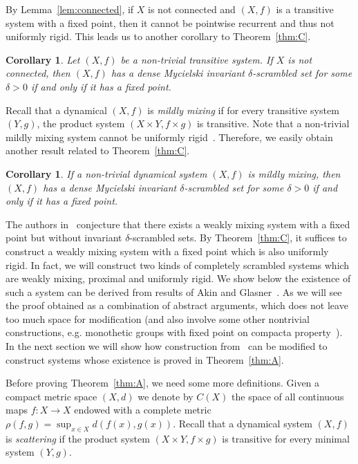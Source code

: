 \documentclass[reqno,a4paper,12pt]{amsart}
\newtheorem{cor}[thm]{Corollary}
\theoremstyle{definition}
\numberwithin{equation}{section}
\begin{document}
By Lemma~\ref{lem:connected}, if $X$ is not connected and $(X,f)$ is a transitive  system with a fixed point,
then it cannot be pointwise recurrent and thus not uniformly rigid.
This leads us to another corollary to Theorem~\ref{thm:C}.

\begin{cor}
Let $(X,f)$ be a non-trivial transitive system.
If $X$ is not connected, then $(X,f)$ has a dense Mycielski invariant $\delta$-scrambled set for some $\delta>0$
if and only if it has a fixed point.
\end{cor}

Recall that a dynamical $(X,f)$ is \emph{mildly mixing} if for every transitive  system $(Y,g)$,
the product system $(X\times Y,f\times g)$ is transitive.
Note that a non-trivial mildly mixing system cannot be uniformly rigid~\cite{GW06,HY04}.
Therefore, we easily obtain another result related to Theorem~\ref{thm:C}.

\begin{cor}
If a non-trivial dynamical system $(X,f)$ is mildly mixing,
then $(X,f)$ has a dense Mycielski invariant $\delta$-scrambled set for some $\delta>0$
if and only if it has a fixed point.
\end{cor}

The authors in~\cite{BGO10} conjecture that there exists a weakly mixing system with a fixed point
but without invariant $\delta$-scrambled sets.
By Theorem~\ref{thm:C}, it suffices to construct
a weakly mixing system with a fixed point which is also uniformly rigid.
In fact, we will construct two kinds of completely scrambled systems which are weakly mixing, proximal and uniformly rigid.
We show below the existence of such a system can be derived from results of Akin and Glasner~\cite{AG}.
As we will see the proof obtained as a combination of abstract arguments, which does not leave
too much space for modification (and also involve some other nontrivial constructions, e.g. monothetic groups with fixed point on compacta property~\cite{Gla}). In the next section we will show how construction from~\cite{KW} can be modified to construct systems whose existence is proved in Theorem~\ref{thm:A}.

Before proving Theorem~\ref{thm:A}, we need some more definitions. Given a compact metric space $(X,d)$
we denote by $C(X)$ the space of all continuous maps $f\colon X\to X$
endowed with a complete metric $\rho(f,g)=\sup_{x\in X} d(f(x),g(x))$.
Recall that a dynamical system $(X,f)$ is \emph{scattering} if
the product system $(X\times Y, f\times g)$ is transitive for every minimal system $(Y,g)$.
\end{document}
